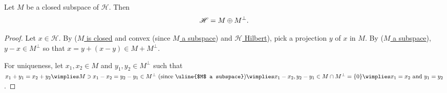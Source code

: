 	\begin{comment}
		\begin{dgrs}
		\begin{lem}
			\st{Let $x_0, z_0\in V$ and $E := \{x\in V : \iprd{x, y_0} = 0\implies\iprd{x, z_0} = 0\}$ be dense in $V$. Then $z_0$ is a multiple of $y_0$.}
		\end{lem}
		
		\begin{prp}\label{PRP: necessity of hilbert-ness in proj's}
			Let $M$ be a dense subspace of $\mathscr H$ and $z_0\in \mathscr H\setminus M$. Then $N := M\cap \{z_0\}^\perp$ is a closed convex subset of $M$ and yet no vector in $M\setminus N$ can be projected onto it.
		\end{prp}
		
		\begin{dgrsProof}
			Suppose $y_0$ is a projection of $x_0\in M\setminus N$ onto $N$. Then $y_0 - x_0\in N^\perp$ by \ref{PRP: proj's on subspaces} so that for every $w\in M$, we have $\iprd{w, y_0 - x_0} = 0$ whenever $\iprd{w, z_0} = 0$. Since \uline{$M$ is dense}, $y_0 - x_0$ is a multiple of $z_0$, and hence $0$ (since $z_0\notin M$ whereas $y_0, x_0\in M$) $\wimplies$ $x_0 = y_0\in M$, a contradiction.
		\end{dgrsProof}
	\end{dgrs}
	\end{comment}
	
	\begin{cor}\label{COR: orth decomp}
		Let $M$ be a closed subspace of $\mathscr H$. Then
		\[
		\mathscr H = M\oplus M^\perp\text.
		\]
	\end{cor}
	
	\begin{proof}
		Let $x\in \mathscr H$. By  (\uline{$M$ is closed} and convex (since \uline{$M$ a subspace}) and \uline{$\mathscr H$ Hilbert}), pick a projection $y$ of $x$ in $M$. By  (\uline{$M$ a subspace}), $y - x\in M^\perp$ so that $x = y + (x - y)\in M + M^\perp$.
		
		For uniqueness, let $x_1, x_2\in M$ and $y_1, y_2\in M^\perp$ such that $x_1 + y_1 = x_2 + y_2\wimplies M\ni x_1 - x_2 = y_2 - y_1\in M^\perp\text{ (since \uline{$M$ a subspace})}\wimplies x_1 - x_2, y_2 - y_1\in M\cap M^\perp = \{0\}\wimplies x_1 = x_2\text{ and } y_1 = y_2$.
	\end{proof}
	
